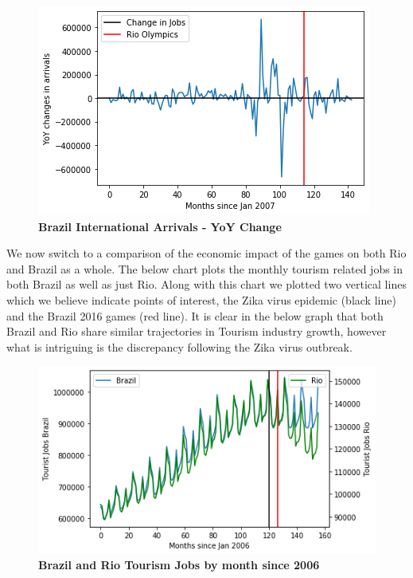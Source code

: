\documentclass[11pt, twocolumn]{article}
\begin{document}
    \begin{figure}[H]
        \centering
            \includegraphics[scale=0.6]{Brazil_Arrivals_deseasoned.png}
        \caption{\textbf{Brazil International Arrivals - YoY Change}}
        \label{fig:Brazil_Arrivals_deseasoned}
    \end{figure}    
    
    We now switch to a comparison of the economic impact of the games on both Rio and Brazil as a whole. The below chart plots the monthly tourism related jobs in both Brazil as well as just Rio. Along with this chart we plotted two vertical lines which we believe indicate points of interest, the Zika virus epidemic (black line) and the Brazil 2016 games (red line). It is clear in the below graph that both Brazil and Rio share similar trajectories in Tourism industry growth, however what is intriguing is the discrepancy following the Zika virus outbreak. 
    
    \begin{figure}[H]
        \centering
            \includegraphics[scale=0.55]{Brazil_and_Rio_Tourism_Jobs.png}
        \caption{\textbf{Brazil and Rio Tourism Jobs by month since 2006}}
        \label{fig:Brazil_Rio_Tourism}
    \end{figure}
\end{document}
